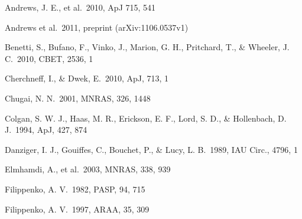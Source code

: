 \documentclass{emulateapj}
\begin{document}
\begin{references}\scriptsize

 Andrews, J. E., et al.\ 2010, ApJ 715, 541

 Andrews et al.\ 2011, preprint (arXiv:1106.0537v1)

 Benetti, S., Bufano, F., Vinko, J., Marion, G. H.,
  Pritchard, T., \& Wheeler, J. C.\ 2010, CBET, 2536, 1

 Cherchneff, I., \& Dwek, E.\ 2010, ApJ, 713, 1

 Chugai, N. N.\ 2001, MNRAS, 326, 1448


 Colgan, S. W. J., Haas, M. R., Erickson, E. F., Lord, S. D.,
\& Hollenbach, D. J.\ 1994, ApJ, 427, 874

 Danziger, I. J., Gouiffes, C., Bouchet, P., \& Lucy, L. B.\
1989, IAU Circ., 4796, 1





 Elmhamdi, A., et al.\ 2003, MNRAS, 338, 939


 Filippenko, A. V.\ 1982, PASP, 94, 715

 Filippenko, A. V.\ 1997, ARAA, 35, 309





\end{references}
\end{document}
